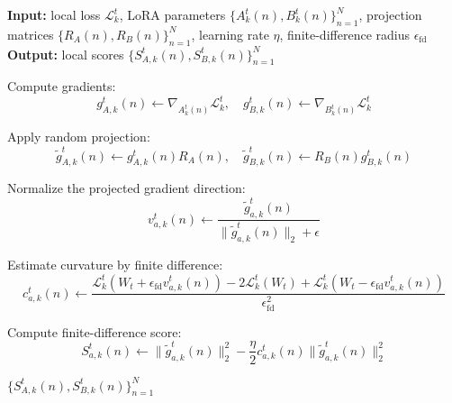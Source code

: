 \begin{algorithm}[h]
\caption{Score Computation $\mathcal{S}_{\mathrm{FD}}(\cdot)$ with Random Projection}
\label{alg:score_fd}
\begin{algorithmic}[1]

\STATE \textbf{Input:} local loss $\mathcal{L}_k^t$, LoRA parameters $\{A_k^t(n), B_k^t(n)\}_{n=1}^{N}$, projection matrices $\{R_A(n), R_B(n)\}_{n=1}^{N}$, learning rate $\eta$, finite-difference radius $\epsilon_{\mathrm{fd}}$
\STATE \textbf{Output:} local scores $\{S_{A,k}^t(n), S_{B,k}^t(n)\}_{n=1}^{N}$


    \STATE Compute gradients:
    \[
    g_{A,k}^t(n) \leftarrow \nabla_{A_k^t(n)} \mathcal{L}_k^t,
    \quad
    g_{B,k}^t(n) \leftarrow \nabla_{B_k^t(n)} \mathcal{L}_k^t
    \]

    \STATE Apply random projection:
    \[
    \widetilde{g}_{A,k}^t(n) \leftarrow g_{A,k}^t(n)R_A(n),
    \quad
    \widetilde{g}_{B,k}^t(n) \leftarrow R_B(n)g_{B,k}^t(n)
    \]


        \STATE Normalize the projected gradient direction:
        \[
        v_{a,k}^t(n) \leftarrow 
        \frac{\widetilde{g}_{a,k}^t(n)}
        {\|\widetilde{g}_{a,k}^t(n)\|_2+\epsilon}
        \]

        \STATE Estimate curvature by finite difference:
        \[
        c_{a,k}^t(n) \leftarrow
        \frac{
        \mathcal{L}_k^t\!\left(W_t+\epsilon_{\mathrm{fd}} v_{a,k}^t(n)\right)
        -2\mathcal{L}_k^t(W_t)
        +\mathcal{L}_k^t\!\left(W_t-\epsilon_{\mathrm{fd}} v_{a,k}^t(n)\right)
        }
        {\epsilon_{\mathrm{fd}}^2}
        \]

        \STATE Compute finite-difference score:
        \[
        S_{a,k}^t(n) \leftarrow
        \|\widetilde{g}_{a,k}^t(n)\|_2^2
        -
        \frac{\eta}{2}
        c_{a,k}^t(n)
        \|\widetilde{g}_{a,k}^t(n)\|_2^2
        \]

    \ENDFOR

\ENDFOR

\RETURN $\{S_{A,k}^t(n), S_{B,k}^t(n)\}_{n=1}^{N}$

\end{algorithmic}
\end{algorithm}
